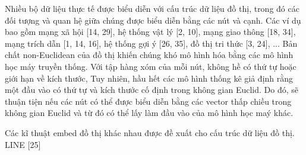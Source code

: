Nhiều bộ dữ liệu thực tế được biểu diễn với cấu trúc dữ liệu đồ thị, trong đó các đối tượng và quan hệ giữa chúng được biểu diễn bằng các nút và cạnh. Các ví dụ bao gồm mạng xã hội [14, 29], hệ thống vật lý [2, 10], mạng giao thông [18, 34], mạng trích dẫn [1, 14, 16], hệ thống gợi ý [26, 35], đồ thị tri thức [3, 24], ... Bản chất non-Euclidean của đồ thị khiến chúng khó mô hình hóa bằng các mô hình học máy truyền thống. Với tập hàng xóm của mỗi nút, không hề có thứ tự hoặc giới hạn về kích thước, Tuy nhiên, hầu hết các mô hình thống kê giả định rằng một đầu vào có thứ tự và kích thước cố định trong không gian Euclid. Do đó, sẽ thuận tiện nếu các nút có thể được biểu diễn bằng các vector thấp chiều trong không gian Euclid và từ đó có thể lấy làm đầu vào của mô hình học maý khác. 

Các kĩ thuật embed đồ thị khác nhau được đề xuất cho cấu trúc dữ liệu đồ thị. LINE [25]